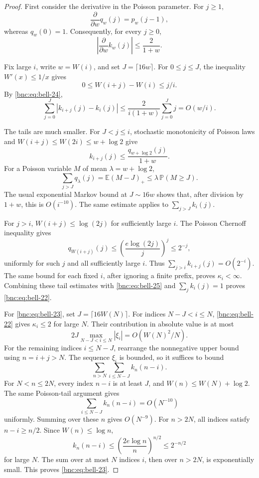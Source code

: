 \documentclass[11pt]{article}
\numberwithin{equation}{section}
\theoremstyle{definition}
\theoremstyle{remark}
\begin{document}
\begin{proof}
First consider the derivative in the Poisson parameter.
For \(j\ge1\),
\[
 \frac{\partial}{\partial w}q_w(j)=p_w(j-1),
\]
whereas \(q_w(0)=1\).
Consequently, for every \(j\ge0\),
\begin{equation}\label{bnc:eq:bell-24}
\left|\frac{\partial}{\partial w}k_w(j)\right|
       \le\frac{2}{1+w}.
\end{equation}

Fix large \(i\), write \(w=W(i)\), and set \(J=\lceil16w\rceil\).
For \(0\le j\le J\), the inequality \(W'(x)\le1/x\) gives
\[
 0\le W(i+j)-W(i)\le j/i.
\]
By \eqref{bnc:eq:bell-24},
\begin{equation}\label{bnc:eq:bell-25}
\sum_{j=0}^{J}|k_{i+j}(j)-k_i(j)|
 \le\frac{2}{i(1+w)}\sum_{j=0}^{J}j
 =O(w/i).
\end{equation}

The tails are much smaller.
For \(J<j\le i\), stochastic monotonicity of Poisson laws and
\(W(i+j)\le W(2i)\le w+\log2\) give
\[
 k_{i+j}(j)
 \le\frac{q_{w+\log2}(j)}{1+w}.
\]
For a Poisson variable \(M\) of mean \(\lambda=w+\log2\),
\[
 \sum_{j>J}q_\lambda(j)
 =\mathbb E(M-J)_+
 \le\lambda\,\mathbb P(M\ge J).
\]
The usual exponential Markov bound at \(J\sim16w\) shows that,
after division by \(1+w\), this is \(O(i^{-10})\).
The same estimate applies to \(\sum_{j>J}k_i(j)\).

For \(j>i\), \(W(i+j)\le\log(2j)\) for sufficiently large \(i\).
The Poisson Chernoff inequality gives
\[
 q_{W(i+j)}(j)
 \le\left(\frac{e\log(2j)}{j}\right)^j\le2^{-j},
\]
uniformly for such \(j\) and all sufficiently large \(i\).
Thus \(\sum_{j>i}k_{i+j}(j)=O(2^{-i})\).
The same bound for each fixed \(i\), after ignoring a finite prefix,
proves \(\kappa_i<\infty\).
Combining these tail estimates with \eqref{bnc:eq:bell-25} and
\(\sum_jk_i(j)=1\) proves \eqref{bnc:eq:bell-22}.

For \eqref{bnc:eq:bell-23}, set \(J=\lceil16W(N)\rceil\).
For indices \(N-J<i\le N\), \eqref{bnc:eq:bell-22} gives \(\kappa_i\le2\) for large \(N\).
Their contribution in absolute value is at most
\[
 2J\max_{N-J<i\le N}|\xi_i|
       =O(W(N)^2/N).
\]
For the remaining indices \(i\le N-J\), rearrange the nonnegative
upper bound using \(n=i+j>N\).
The sequence \(\xi_i\) is bounded, so it suffices to bound
\[
 \sum_{n>N}\sum_{i\le N-J}k_n(n-i).
\]
For \(N<n\le2N\), every index \(n-i\) is at least \(J\), and
\(W(n)\le W(N)+\log2\).
The same Poisson-tail argument gives
\[
 \sum_{i\le N-J}k_n(n-i)=O(N^{-10})
\]
uniformly.  Summing over these \(n\) gives \(O(N^{-9})\).
For \(n>2N\), all indices satisfy \(n-i\ge n/2\).
Since \(W(n)\le\log n\),
\[
 k_n(n-i)
 \le\left(\frac{2e\log n}{n}\right)^{n/2}
 \le2^{-n/2}
\]
for large \(N\).
The sum over at most \(N\) indices \(i\), then over \(n>2N\),
is exponentially small.
This proves \eqref{bnc:eq:bell-23}.
\end{proof}
\end{document}
